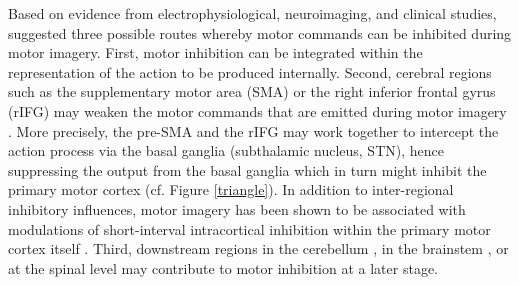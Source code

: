 \documentclass[utf8]{template/frontiersSCNS} %
\begin{document}
Based on evidence from electrophysiological, neuroimaging, and clinical studies, \cite{guillot_imagining_2012} suggested three possible routes whereby motor commands can be inhibited during motor imagery. First, motor inhibition can be integrated within the representation of the action to be produced internally. Second, cerebral regions such as the supplementary motor area (SMA) \citep{kasess_suppressive_2008} or the right inferior frontal gyrus (rIFG) may weaken the motor commands that are emitted during motor imagery \citep[e.g.,][]{angelini_motor_2015, angelini_proactive_2016}. More precisely, the pre-SMA and the rIFG may work together to intercept the action process via the basal ganglia (subthalamic nucleus, STN), hence suppressing the output from the basal ganglia which in turn might inhibit the primary motor cortex \citep{aron_reactive_2011} (cf. Figure \ref{triangle}). In addition to inter-regional inhibitory influences, motor imagery has been shown to be associated with modulations of short-interval intracortical inhibition within the primary motor cortex itself \citep{neige_unravelling_2020}.
Third, downstream regions in the cerebellum \citep[e.g.,][]{lotze_activation_1999}, in the brainstem \citep[e.g.,][]{jeannerod_neural_2001, jeannerod_motor_2006}, or at the spinal level may contribute to motor inhibition at a later stage.


\end{document}
